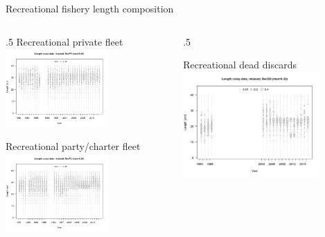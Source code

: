 \documentclass[ignorenonframetext,]{beamer}
\def\begincols{\begin{columns}}
\def\begincol{\begin{column}}
\def\endcol{\end{column}}
\def\endcols{\end{columns}}
\begin{document}
\begin{frame}{Recreational fishery length composition}

\begincols
 \begincol{.5\textwidth} Recreational private fleet
\includegraphics[height=3cm]{r4ss/plots_mod1/comp_lendat_bubflt4mkt2.png}

Recreational party/charter fleet
\includegraphics[height=3cm]{r4ss/plots_mod1/comp_lendat_bubflt5mkt2_page2.png}
\endcol
 \begincol{.5\textwidth} \centering

Recreational dead discards
\includegraphics[height=4cm]{r4ss/plots_mod1/comp_lendat_bubflt6mkt2.png}
\endcol
\endcols

\end{frame}
\end{document}
